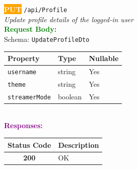 \begin{tcolorbox}[
    colback=orange!5,
    colframe=orange,
    arc=2mm,
    boxrule=1pt,
    left=5pt,
    right=5pt,
    top=5pt,
    bottom=5pt
]
\noindent\colorbox{orange}{\textcolor{white}{\textbf{PUT}}} 
\texttt{\large /api/Profile}\\[0.3em]
\textit{Update profile details of the logged-in user}\\[0.3em]
\vspace{0.3em}
\textbf{\textcolor{green}{Request Body:}}\\[0.2em]
Schema: \texttt{UpdateProfileDto}\\[0.3em]
\begin{tabular}{|l|l|l|}
\hline
\rowcolor{green!10}
\textbf{Property} & \textbf{Type} & \textbf{Nullable} \\ \hline
\texttt{username} & string & Yes \\ \hline
\rowcolor{gray!5}
\texttt{theme} & string & Yes \\ \hline
\texttt{streamerMode} & boolean & Yes \\ \hline
\end{tabular}\\[0.5em]
\vspace{0.3em}
\textbf{\textcolor{purple}{Responses:}}\\[0.2em]
\begin{tabular}{|c|p{10cm}|}
\hline
\rowcolor{gray!20}
\textbf{Status Code} & \textbf{Description} \\ \hline
\colorbox{green!20}{\textbf{200}} & OK \\ \hline
\end{tabular}
\end{tcolorbox}
\vspace{0.5em}

